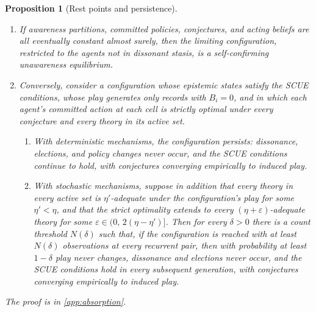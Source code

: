 \documentclass[11pt]{article}
\newtheorem{proposition}[assumption]{Proposition}
\theoremstyle{definition}
\begin{document}
\begin{proposition}[Rest points and persistence]
\label{prop:rest-points}
\leavevmode
\begin{enumerate}[label=(\roman*)]
  \item If awareness partitions, committed policies, conjectures, and acting
  beliefs are all eventually constant almost surely, then the limiting
  configuration, restricted to the agents not in dissonant stasis, is a
  self-confirming unawareness equilibrium.
  \item Conversely, consider a configuration whose epistemic states satisfy
  the SCUE conditions, whose play generates only records with $B_i=0$, and
  in which each agent's committed action at each cell is strictly optimal
  under every conjecture and every theory in its active set.
  \begin{enumerate}[label=(\alph*)]
    \item With deterministic mechanisms, the configuration persists:
    dissonance, elections, and policy changes never occur, and the SCUE
    conditions continue to hold, with conjectures converging empirically to
    induced play.
    \item With stochastic mechanisms, suppose in addition that every theory
    in every active set is $\eta'$-adequate under the configuration's play
    for some $\eta'<\eta$, and that the strict optimality extends to every
    $(\eta+\varepsilon)$-adequate theory for some
    $\varepsilon\in(0,\,2(\eta-\eta')]$.  Then for every $\delta>0$ there is
    a count threshold $N(\delta)$ such that, if the configuration is reached
    with at least $N(\delta)$ observations at every recurrent pair, then
    with probability at least $1-\delta$ play never changes, dissonance and
    elections never occur, and the SCUE conditions hold in every subsequent
    generation, with conjectures converging empirically to induced play.
  \end{enumerate}
\end{enumerate}
The proof is in \cref{app:absorption}.
\end{proposition}
\end{document}
